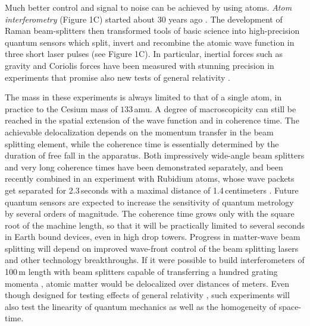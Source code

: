 \documentclass[12pt]{article}
\begin{document}
Much better control and signal to noise can be achieved by using atoms. 
\emph{Atom interferometry } (Figure 1C) started about 30 years ago \cite{Gould1986,Keith1988,Borde1989}.
The development of Raman \cite{Kasevich1991a} beam-splitters then  transformed tools of basic science into high-precision quantum sensors
which split, invert and recombine the atomic wave function in three short laser pulses (see Figure 1C).
In particular, inertial forces such as gravity and Coriolis forces\cite{Peters1999,Stockton2011} have been measured with stunning precision in experiments
that promise also new tests of general relativity \cite{Hohensee2011}.

The mass in these experiments is always limited to that of a single atom, in practice to the Cesium mass of $133$\,amu. A degree of macroscopicity can still be reached in the spatial extension of the wave function and in coherence time.
The achievable delocalization depends on the momentum transfer in the beam splitting element, while the coherence time is essentially determined by the duration of free fall
in the apparatus. Both impressively wide-angle beam splitters\cite{Mueller2008,Chiow2011} and very long coherence times \cite{Muentinga2013} have been demonstrated separately, and 
been recently combined in an experiment with Rubidium atoms, whose wave packets get separated for 2.3\,seconds with a maximal distance of 1.4\,centimeters \cite{Dickerson2013}.
Future quantum 
sensors are expected 
to increase the sensitivity of quantum metrology by several orders of magnitude.
The coherence time grows only with the square root of the machine length, so that it will be practically limited to several seconds in Earth bound devices, even in high drop towers. Progress in matter-wave beam splitting will depend on improved wave-front control of the beam splitting lasers and other technology breakthroughs.
If it were possible to build interferometers of 100\,m length with beam splitters capable of transferring 
a hundred grating momenta \cite{Dimopoulos2007},
atomic matter would be delocalized over 
distances of meters.
Even though designed for testing effects of general relativity \cite{Hohensee2011,Bouyer2010}, such experiments will also test the linearity of quantum mechanics\cite{Nimmrichter2013} as well as the homogeneity of space-time\cite{Percival1997}.
\end{document}
